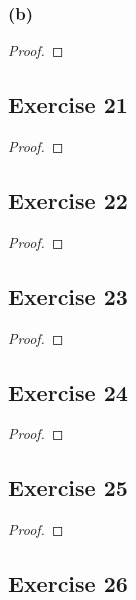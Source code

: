 \documentclass[14pt]{extarticle}
\begin{document}
\subsubsection{(b)}

\begin{proof}

\end{proof}

\subsection{Exercise 21}

\begin{proof}

\end{proof}

\subsection{Exercise 22}

\begin{proof}

\end{proof}

\subsection{Exercise 23}

\begin{proof}

\end{proof}

\subsection{Exercise 24}

\begin{proof}

\end{proof}

\subsection{Exercise 25}

\begin{proof}

\end{proof}

\subsection{Exercise 26}
\end{document}
